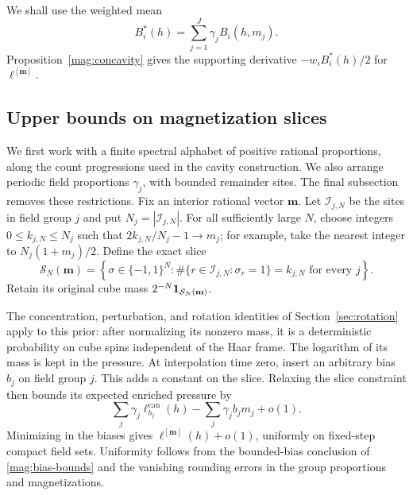 We shall use the weighted mean
\[
 B_i^*(h)=\sum_{j=1}^J\gamma_jB_i(h,m_j).
\]
Proposition~\ref{mag:concavity} gives the supporting derivative
$-w_iB_i^*(h)/2$ for $\ell^{[\mathbf m]}$.

\subsection{Upper bounds on magnetization slices}

We first work with a finite spectral alphabet of positive rational
proportions, along the count progressions used in the cavity construction.
We also arrange periodic field proportions $\gamma_j$, with bounded
remainder sites. The final subsection removes these restrictions.
Fix an interior rational vector $\mathbf m$. Let $\mathcal I_{j,N}$ be
the sites in field group $j$ and put $N_j=|\mathcal I_{j,N}|$. For all
sufficiently large $N$, choose integers $0\le k_{j,N}\le N_j$ such that $2k_{j,N}/N_j-1\to m_j$;
for example, take the nearest integer to $N_j(1+m_j)/2$. Define the
exact slice
\[
 \mathcal S_N(\mathbf m)=
 \left\{\sigma\in\{-1,1\}^N:
   \#\{r\in\mathcal I_{j,N}:\sigma_r=1\}=k_{j,N}
   \text{ for every }j\right\}.
\]
Retain its original cube mass $2^{-N}\mathbf 1_{\mathcal S_N(\mathbf m)}$.

The concentration, perturbation, and rotation identities of
Section~\ref{sec:rotation} apply to this prior: after normalizing its
nonzero mass, it is a deterministic probability on cube spins independent
of the Haar frame. The logarithm of its mass is kept in the pressure.
At interpolation time zero, insert an arbitrary bias $b_j$ on field
group $j$. This adds a constant on the slice. Relaxing the slice constraint
then bounds its expected enriched pressure by
\[
 \sum_j\gamma_j\ell_{b_j}^{\mathrm{can}}(h)
                -\sum_j\gamma_jb_jm_j+o(1).
\]
Minimizing in the biases gives $\ell^{[\mathbf m]}(h)+o(1)$,
uniformly on fixed-step compact field sets. Uniformity follows from
the bounded-bias conclusion of \eqref{mag:bias-bounds} and the vanishing
rounding errors in the group proportions and magnetizations.

